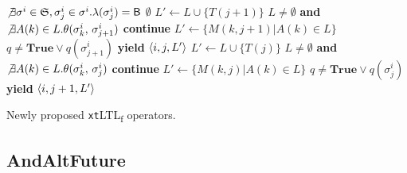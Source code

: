 \documentclass[information,article,accept,pdftex,oneauthor]{Definitions/mdpi}
\newcommand{\LOG}{\ensuremath{\mathfrak{S}}}
\begin{document}
\begin{algorithm}[H]
{\begin{minipage}{1.4\textwidth}
\begin{algorithmic}[1]
\Statex
{}
\State \algorithmicif\; $\not\exists \sigma^i\in\LOG,\sigma^i_j\in\sigma^i. \lambda(\sigma^i_j)=\textsf{B}$ \algorithmicthen\;\Return $\emptyset$\label{countScan}
\label{firstCond}
\State $L'\gets L\cup\{T(j+1)\}$
\State \algorithmicif\; $L\neq\emptyset$ \textbf{and} $\not\exists A(k)\in L. \theta(\sigma^i_k,\,\sigma^i_{j+1})$ \algorithmicthen\; \textbf{continue}
\State \algorithmicelse\; $L'\gets \{M(k,j+1)|A(k)\in L\}$\label{hasMatch1}
\EndIf
\State \algorithmicif\; $q\neq\textbf{True}\vee q(\sigma^i_{j+1})$ \algorithmicthen\; \textbf{yield} $\braket{i,j,L'}$ \label{actualReturn1}
\EndFor
\EndFunction
\Statex
{}
\State $L'\gets L\cup\{T(j)\}$
\State \algorithmicif\; $L\neq\emptyset$ \textbf{and} $\not\exists A(k)\in L. \theta(\sigma^i_k,\,\sigma^i_{j})$ \algorithmicthen\; \textbf{continue}
\State \algorithmicelse\; $L'\gets \{M(k,j)|A(k)\in L\}$
\EndIf
\State \algorithmicif\; $q\neq\textbf{True}\vee q(\sigma^i_{j})$ \algorithmicthen\; \textbf{yield} $\braket{i,j+1,L'}$
\EndFor
\EndFunction

\end{algorithmic}
		\end{minipage}%
	}%
	\endgroup


 \caption{Newly proposed \texttt{xt}LTL\textsubscript{f} operators.}\label{algo:fdgt}
\end{algorithm}



\subsection{{AndAltFuture} %
} 
\end{document}
